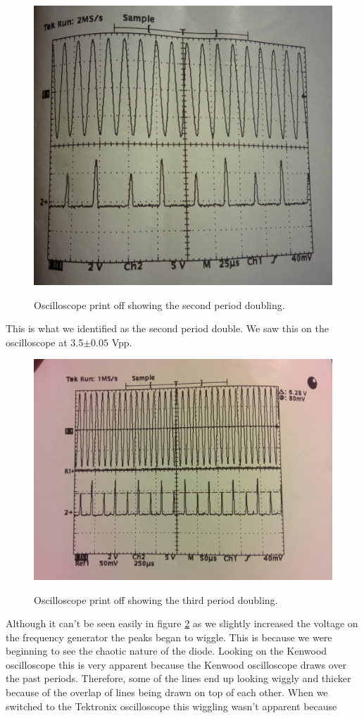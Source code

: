 \documentclass[12pt letterpaper]{article}
\begin{document}
\begin{figure}[H]
  \caption{Oscilloscope print off showing the second period doubling.}
  \centering
    \includegraphics[width=.60\textwidth]{second_doubling.jpg}
    \label{fig:second}
\end{figure}

This is what we identified as the second period double. We saw this on the oscilloscope at 3.5$\pm0.05$ Vpp. 

\begin{figure}[H]
  \caption{Oscilloscope print off showing the third period doubling.}
  \centering
    \includegraphics[width=.60\textwidth]{third_doubling.jpg}
    \label{fig:third}
\end{figure}

Although it can't be seen easily in figure \ref{fig:third} as we slightly increased the voltage on the frequency generator the peaks began to wiggle. This is because we were beginning to see the chaotic nature of the diode. Looking on the Kenwood oscilloscope this is very apparent because the Kenwood oscilloscope draws over the past periods. Therefore, some of the lines end up looking wiggly and thicker because of the overlap of lines being drawn on top of each other. When we switched to the Tektronix oscilloscope this wiggling wasn't apparent because 
\end{document}
